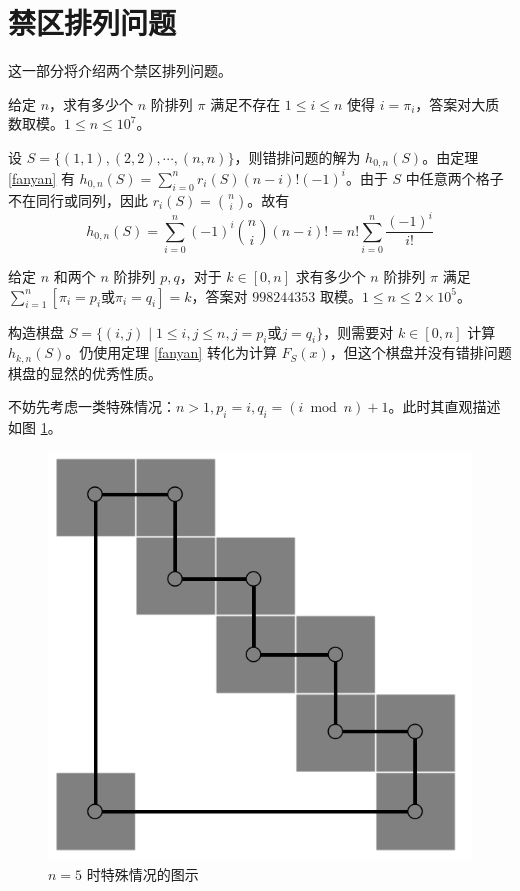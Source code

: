 \documentclass{noithesis}
\begin{document}
	\section{禁区排列问题}
	
	这一部分将介绍两个禁区排列问题。
	
	\begin{problem}
		给定 $n$，求有多少个 $n$ 阶排列 $\pi$ 满足不存在 $1 \leq i \leq n$ 使得 $i = \pi_i$，答案对大质数取模。$1 \leq n \leq 10^7$。
	\end{problem}
	
	设 $S = \{(1,1),(2,2),\cdots,(n,n)\}$，则错排问题的解为 $h_{0,n}(S)$。由定理 \ref{fanyan} 有 $h_{0,n}(S) = \sum_{i=0}^n r_i(S) (n-i)! (-1)^i$。由于 $S$ 中任意两个格子不在同行或同列，因此 $r_i(S) = \binom{n}{i}$。故有\begin{equation}
	h_{0,n}(S) = \sum_{i=0}^n (-1)^i \binom{n}{i}(n-i)! = n! \sum_{i=0}^n \frac{(-1)^i}{i!}
	\end{equation}
	
	\begin{problem}
		给定 $n$ 和两个 $n$ 阶排列 $p,q$，对于 $k \in [0,n]$ 求有多少个 $n$ 阶排列 $\pi$ 满足 $\sum_{i=1}^n [\pi_i = p_i \text{或} \pi_i = q_i] = k$，答案对 $998244353$ 取模。$1 \leq n \leq 2\times 10^5$。
	\end{problem}
	
	构造棋盘 $S = \{(i,j) \mid 1 \leq i,j \leq n , j = p_i \text{或}j=q_i\}$，则需要对 $k \in [0,n]$ 计算 $h_{k,n}(S)$。仍使用定理 \ref{fanyan} 转化为计算 $F_S(x)$，但这个棋盘并没有错排问题棋盘的显然的优秀性质。
	
	不妨先考虑一类特殊情况：$n>1,p_i = i,q_i = (i \bmod n) + 1$。此时其直观描述如图 \ref{f4}。
	
	\begin{figure}[h]
		\centering
		\caption{$n=5$ 时特殊情况的图示}
		\label{f4}
		\includegraphics[scale=0.23]{picture/figure4-1.png}
	\end{figure}
	
\end{document}

